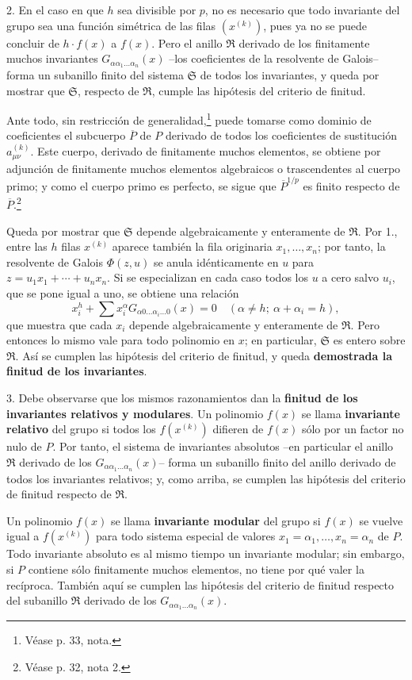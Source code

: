 \documentclass[11pt]{article}
\begin{document}
2. En el caso en que $h$ sea divisible por $p$, no es necesario que todo invariante del grupo sea una función simétrica de las filas $(x^{(k)})$, pues ya no se puede concluir de $h\cdot f(x)$ a $f(x)$. Pero el anillo $\mathfrak R$ derivado de los finitamente muchos invariantes $G_{\alpha\alpha_1\ldots\alpha_n}(x)$ --los coeficientes de la resolvente de Galois-- forma un subanillo finito del sistema $\mathfrak S$ de todos los invariantes, y queda por mostrar que $\mathfrak S$, respecto de $\mathfrak R$, cumple las hipótesis del criterio de finitud.

Ante todo, sin restricción de generalidad,\footnote{Véase p. 33, nota.} puede tomarse como dominio de coeficientes el subcuerpo $\overline P$ de $P$ derivado de todos los coeficientes de sustitución $a_{\mu\nu}^{(k)}$. Este cuerpo, derivado de finitamente muchos elementos, se obtiene por adjunción de finitamente muchos elementos algebraicos o trascendentes al cuerpo primo; y como el cuerpo primo es perfecto, se sigue que $\overline P^{1/p}$ es finito respecto de $\overline P$.\footnote{Véase p. 32, nota 2.}

Queda por mostrar que $\mathfrak S$ depende algebraicamente y enteramente de $\mathfrak R$. Por 1., entre las $h$ filas $x^{(k)}$ aparece también la fila originaria $x_1,\ldots,x_n$; por tanto, la resolvente de Galois $\Phi(z,u)$ se anula idénticamente en $u$ para $z=u_1x_1+\cdots+u_nx_n$. Si se especializan en cada caso todos los $u$ a cero salvo $u_i$, que se pone igual a uno, se obtiene una relación
\[
 x_i^h+\sum x_i^\alpha G_{\alpha0\ldots\alpha_i\ldots0}(x)=0
 \quad (\alpha\ne h;\ \alpha+\alpha_i=h),
\]
que muestra que cada $x_i$ depende algebraicamente y enteramente de $\mathfrak R$. Pero entonces lo mismo vale para todo polinomio en $x$; en particular, $\mathfrak S$ es entero sobre $\mathfrak R$. Así se cumplen las hipótesis del criterio de finitud, y queda \textbf{demostrada la finitud de los invariantes}.

3. Debe observarse que los mismos razonamientos dan la \textbf{finitud de los invariantes relativos y modulares}. Un polinomio $f(x)$ se llama \textbf{invariante relativo} del grupo si todos los $f(x^{(k)})$ difieren de $f(x)$ sólo por un factor no nulo de $P$. Por tanto, el sistema de invariantes absolutos --en particular el anillo $\mathfrak R$ derivado de los $G_{\alpha\alpha_1\ldots\alpha_n}(x)$-- forma un subanillo finito del anillo derivado de todos los invariantes relativos; y, como arriba, se cumplen las hipótesis del criterio de finitud respecto de $\mathfrak R$.

Un polinomio $f(x)$ se llama \textbf{invariante modular} del grupo si $f(x)$ se vuelve igual a $f(x^{(k)})$ para todo sistema especial de valores $x_1=\alpha_1,\ldots,x_n=\alpha_n$ de $P$. Todo invariante absoluto es al mismo tiempo un invariante modular; sin embargo, si $P$ contiene sólo finitamente muchos elementos, no tiene por qué valer la recíproca. También aquí se cumplen las hipótesis del criterio de finitud respecto del subanillo $\mathfrak R$ derivado de los $G_{\alpha\alpha_1\ldots\alpha_n}(x)$.
\end{document}
